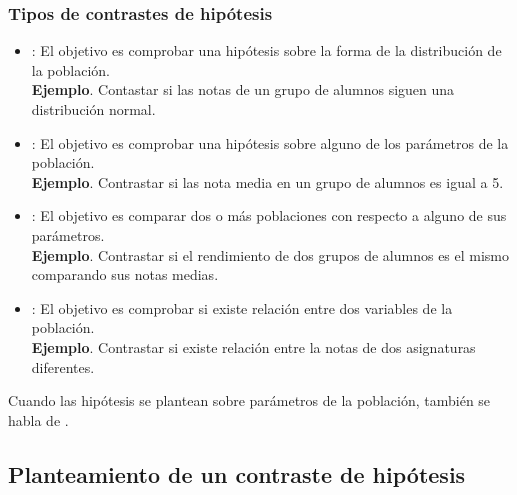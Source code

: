 \begin{frame}
\frametitle{Tipos de contrastes de hipótesis}
\begin{itemize}[<+->]
\item {}: El objetivo es comprobar una hipótesis sobre la forma de la
distribución de la población.\\
\textbf{Ejemplo}. Contastar si las notas de un grupo de alumnos siguen una distribución normal.
\item {}: El objetivo es comprobar una hipótesis sobre alguno de los parámetros
de la población.\\
\textbf{Ejemplo}. Contrastar si las nota media en un grupo de alumnos es igual a 5.
\item {}: El objetivo es comparar dos o más poblaciones con respecto a alguno de sus
parámetros.\\
\textbf{Ejemplo}. Contrastar si el rendimiento de dos grupos de alumnos es el mismo comparando sus notas medias.
\item {}: El objetivo es comprobar si existe relación entre dos
variables de la población.\\
\textbf{Ejemplo}. Contrastar si existe relación entre la notas de dos asignaturas diferentes.
\end{itemize}

\pause
Cuando las hipótesis se plantean sobre parámetros de la población, también se habla de .
\end{frame}


\subsection{Planteamiento de un contraste de hipótesis}


